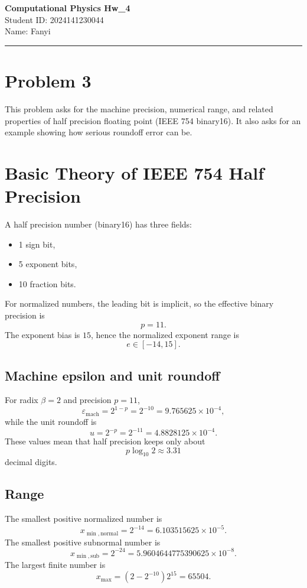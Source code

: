 \documentclass[12pt,a4paper]{article}
\newcommand{\HomeworkTitle}{Computational Physics Hw\_4}
\newcommand{\StudentID}{2024141230044}
\newcommand{\StudentName}{Fanyi}
\begin{document}
\begin{center}
    {\LARGE \textbf{\HomeworkTitle}}\\[1.2em]
    {\large Student ID: \StudentID}\\[0.5em]
    {\large Name: \StudentName}
\end{center}

\vspace{0.5em}
\noindent\rule{\textwidth}{0.8pt}
\vspace{0.5em}

\section*{Problem 3}

This problem asks for the machine precision, numerical range, and related properties of half precision floating point (IEEE 754 binary16). It also asks for an example showing how serious roundoff error can be.

\newpage
\tableofcontents
\newpage

\section{Basic Theory of IEEE 754 Half Precision}

A half precision number (binary16) has three fields:
\begin{itemize}[leftmargin=2.5em]
    \item 1 sign bit,
    \item 5 exponent bits,
    \item 10 fraction bits.
\end{itemize}
For normalized numbers, the leading bit is implicit, so the effective binary precision is
\[
    p = 11.
\]
The exponent bias is $15$, hence the normalized exponent range is
\[
    e\in[-14,15].
\]

\subsection{Machine epsilon and unit roundoff}
For radix $\beta=2$ and precision $p=11$,
\[
    \varepsilon_{\mathrm{mach}} = 2^{1-p}=2^{-10}=9.765625\times10^{-4},
\]
while the unit roundoff is
\[
    u = 2^{-p}=2^{-11}=4.8828125\times10^{-4}.
\]
These values mean that half precision keeps only about
\[
    p\log_{10}2 \approx 3.31
\]
decimal digits.

\subsection{Range}
The smallest positive normalized number is
\[
    x_{\min,\mathrm{normal}} = 2^{-14}=6.103515625\times10^{-5}.
\]
The smallest positive subnormal number is
\[
    x_{\min,\mathrm{sub}} = 2^{-24}=5.9604644775390625\times10^{-8}.
\]
The largest finite number is
\[
    x_{\max} = (2-2^{-10})2^{15}=65504.
\]
\end{document}
